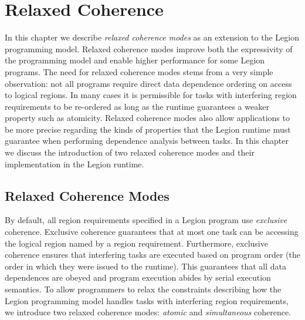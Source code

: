 

\chapter{Relaxed Coherence}
\label{chapter:relaxed}
In this chapter we describe {\em relaxed coherence
modes} as an extension to the Legion programming 
model. Relaxed coherence modes improve both the 
expressivity of the programming model and enable 
higher performance for some Legion programs. The need
for relaxed coherence modes stems from a very
simple observation: not all programs require
direct data dependence ordering on access to 
logical regions. In many cases it is permissible
for tasks with interfering region requirements 
to be re-ordered as long as the runtime guarantees
a weaker property such as atomicity. Relaxed
coherence modes also allow applications to be more
precise regarding the kinds of properties that the
Legion runtime must guarantee when performing
dependence analysis between tasks. In this chapter
we discuss the introduction of two relaxed coherence
modes and their implementation in the Legion runtime.

\section{Relaxed Coherence Modes}
\label{sec:relaxedmodes}
By default, all region requirements specified in
a Legion program use {\em exclusive} coherence.
Exclusive coherence guarantees that at most one
task can be accessing the logical region named by 
a region requirement. Furthermore, exclusive
coherence ensures that interfering tasks are 
executed based on program order (the order in 
which they were issued to the runtime). This
guarantees that all data dependences are 
obeyed and program execution abides by serial
execution semantics. To allow programmers to 
relax the constraints describing how the Legion 
programming model handles tasks with interfering 
region requirements, we introduce two relaxed 
coherence modes: {\em atomic} and 
{\em simultaneous} coherence.


